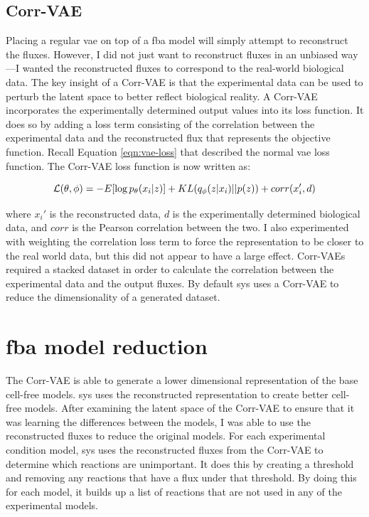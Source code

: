 \subsection{Corr-VAE}
Placing a regular \gls{vae} on top of a \gls{fba} model will simply attempt to reconstruct the fluxes.
However, I did not just want to reconstruct fluxes in an unbiased way---I wanted the reconstructed fluxes to correspond to the real-world biological data.
The key insight of a Corr-VAE is that the experimental data can be used to perturb the latent space to better reflect biological reality.
A Corr-VAE incorporates the experimentally determined output values into its loss function.
It does so by adding a loss term consisting of the correlation between the experimental data and the reconstructed flux that represents the objective function.
Recall Equation \ref{eqn:vae-loss} that described the normal \gls{vae} loss function.
The Corr-VAE loss function is now written as:

\begin{equation}\label{eqn:corr-loss}
\mathcal{L}(\theta, \phi) = - E[\log p_{\theta}(x_i | z)] + KL(q_{\phi}(z | x_i) || p(z)) + corr(x_i', d)\\
\end{equation}

where $x_i'$ is the reconstructed data, $d$ is the experimentally determined biological data, and $corr$ is the Pearson correlation between the two.
I also experimented with weighting the correlation loss term to force the representation to be closer to the real world data, but this did not appear to have a large effect.
Corr-VAEs required a stacked dataset in order to calculate the correlation between the experimental data and the output fluxes.
By default \gls{sys} uses a Corr-VAE to reduce the dimensionality of a generated dataset.

\section{\gls{fba} model reduction}
The Corr-VAE is able to generate a lower dimensional representation of the base cell-free models.
\gls{sys} uses the reconstructed representation to create better cell-free models.
After examining the latent space of the Corr-VAE to ensure that it was learning the differences between the models, I was able to use the reconstructed fluxes to reduce the original models.
For each experimental condition model, \gls{sys} uses the reconstructed fluxes from the Corr-VAE to determine which reactions are unimportant.
It does this by creating a threshold and removing any reactions that have a flux under that threshold.
By doing this for each model, it builds up a list of reactions that are not used in any of the experimental models.

